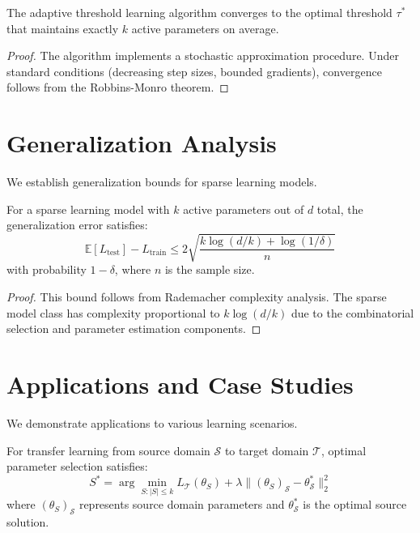 \begin{theorem}
\label{thm:threshold_convergence}
The adaptive threshold learning algorithm converges to the optimal threshold $\tau^*$ that maintains exactly $k$ active parameters on average.
\end{theorem}

\begin{proof}
The algorithm implements a stochastic approximation procedure. Under standard conditions (decreasing step sizes, bounded gradients), convergence follows from the Robbins-Monro theorem.
\end{proof}

\section{Generalization Analysis}

We establish generalization bounds for sparse learning models.

\begin{theorem}
\label{thm:sparse_generalization}
For a sparse learning model with $k$ active parameters out of $d$ total, the generalization error satisfies:
$$\mathbb{E}[L_{\text{test}}] - L_{\text{train}} \leq 2\sqrt{\frac{k \log(d/k) + \log(1/\delta)}{n}}$$
with probability $1-\delta$, where $n$ is the sample size.
\end{theorem}

\begin{proof}
This bound follows from Rademacher complexity analysis. The sparse model class has complexity proportional to $k \log(d/k)$ due to the combinatorial selection and parameter estimation components.
\end{proof}

\section{Applications and Case Studies}

We demonstrate applications to various learning scenarios.

\begin{theorem}
\label{thm:transfer_learning}
For transfer learning from source domain $\mathcal{S}$ to target domain $\mathcal{T}$, optimal parameter selection satisfies:
$$S^* = \arg\min_{S: |S| \leq k} L_{\mathcal{T}}(\theta_S) + \lambda \|(\theta_S)_{\mathcal{S}} - \theta^*_{\mathcal{S}}\|_2^2$$
where $(\theta_S)_{\mathcal{S}}$ represents source domain parameters and $\theta^*_{\mathcal{S}}$ is the optimal source solution.
\end{theorem}

